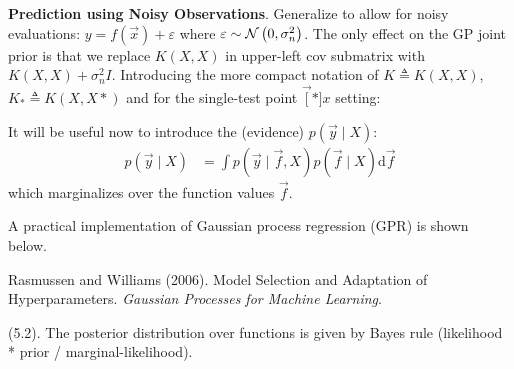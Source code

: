 \documentclass[11pt]{article}
\begin{document}
\textbf{Prediction using Noisy Observations}. Generalize to allow for noisy evaluations: $y = f(\vec x) + \varepsilon$ where $\varepsilon \sim \mathcal{N}\left( 0, \sigma_n^2 \right)$. The only effect on the GP joint prior is that we replace $K(X, X)$ in upper-left cov submatrix with $K(X, X) + \sigma_n^2 I$. Introducing the more compact notation of $K \triangleq K(X, X)$, $K_* \triangleq K(X, X*)$ and for the single-test point $\vec[*]{x}$ setting:

It will be useful now to introduce the  (evidence) $p(\vec y \mid X)$:
\begin{align}
	p(\vec y \mid X)
		&= \int p(\vec y \mid \vec f, X) p(\vec f \mid X) \mathrm{d} \vec f
\end{align}
which marginalizes over the function values $\vec f$. 


\clearpage
A practical implementation of Gaussian process regression (GPR) is shown below. 












\vspace{-1.7em}
{\scriptsize Rasmussen and Williams (2006). Model Selection and Adaptation of Hyperparameters. \textit{Gaussian Processes for Machine Learning}.\\ }

 (5.2). The posterior distribution over functions is given by Bayes rule (likelihood * prior / marginal-likelihood). 
\end{document}
